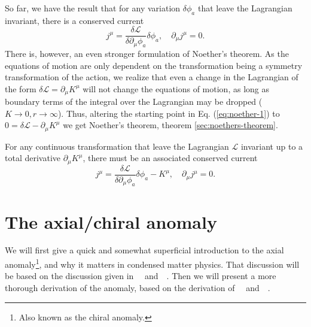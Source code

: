 So far, we have the result that for any variation $\delta \phi_a$ that leave the Lagrangian invariant, there is a conserved current
\begin{equation}
  j^{\mu} = \frac{\delta \mathcal{L}}{\delta \partial_{\mu}\phi_a} \delta\phi_a, \quad \partial_{\mu}j^{\mu} = 0.
\end{equation}
There is, however, an even stronger formulation of Noether's theorem.
As the equations of motion are only dependent on the transformation being a symmetry transformation of the action, we realize that even a change in the Lagrangian of the form $\delta \mathcal{L} = \partial_{\mu}K^{\mu}$ will not change the equations of motion, as long as boundary terms of the integral over the Lagrangian may be dropped ($K\to  0, r \to \infty$).
Thus, altering the starting point in Eq. (\ref{eq:noether-1}) to $0 = \delta \mathcal{L} - \partial_{\mu}K^{\mu}$ we get Noether's theorem, theorem \ref{sec:noethers-theorem}.
\begin{theorem}\label{sec:noethers-theorem}
  For any continuous transformation that leave the Lagrangian $\mathcal{L}$ invariant up to a total derivative $\partial _{\mu }K^{\mu }$, there must be an associated conserved current
  \begin{equation}
    \label{eq:noether_thm}
    j^{\mu} = \frac{\delta \mathcal{L}}{\delta \partial_{\mu} \phi_a} \delta \phi_a - K^{\mu}, \quad \partial_{\mu }j^{\mu } =0.
  \end{equation}
\end{theorem}


\section{The axial/chiral anomaly}
We will first give a quick and somewhat superficial introduction to the axial anomaly\footnote{Also known as the chiral anomaly.}, and why it matters in condensed matter physics.
That discussion will be based on the discussion given in~\citeauthor{wehlingDiracMaterials2014}~\cite{wehlingDiracMaterials2014} and~\citeauthor{tongGaugeTheoryLecture}~\cite[Ch.~3]{tongGaugeTheoryLecture}.
Then we will present a more thorough derivation of the anomaly, based on the derivation of~\citeauthor{zeeQuantumFieldTheory2010}~\cite{zeeQuantumFieldTheory2010} and~\citeauthor{kachelriessQuantumFieldsHubble2018}~\cite{kachelriessQuantumFieldsHubble2018}.

